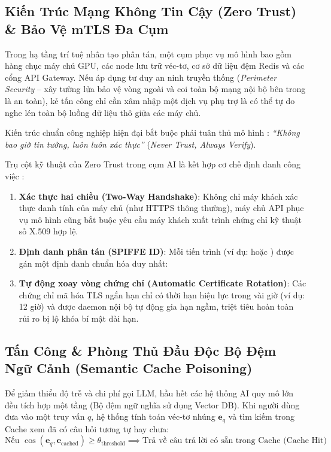 \subsection{Kiến Trúc Mạng Không Tin Cậy (Zero Trust) \& Bảo Vệ mTLS Đa Cụm}
Trong hạ tầng trí tuệ nhân tạo phân tán, một cụm phục vụ mô hình bao gồm hàng chục máy chủ GPU, các node lưu trữ véc-tơ, cơ sở dữ liệu đệm Redis và các cổng API Gateway. Nếu áp dụng tư duy an ninh truyền thống (\textit{Perimeter Security} -- xây tường lửa bảo vệ vòng ngoài và coi toàn bộ mạng nội bộ bên trong là an toàn), kẻ tấn công chỉ cần xâm nhập một dịch vụ phụ trợ là có thể tự do nghe lén toàn bộ luồng dữ liệu thô giữa các máy chủ.

Kiến trúc chuẩn công nghiệp hiện đại bắt buộc phải tuân thủ mô hình : \textit{``Không bao giờ tin tưởng, luôn luôn xác thực''} (\textit{Never Trust, Always Verify}).

Trụ cột kỹ thuật của Zero Trust trong cụm AI là  kết hợp cơ chế định danh công việc :
\begin{enumerate}
  \item \textbf{Xác thực hai chiều (Two-Way Handshake)}: Không chỉ máy khách xác thực danh tính của máy chủ (như HTTPS thông thường), máy chủ API phục vụ mô hình cũng bắt buộc yêu cầu máy khách xuất trình chứng chỉ kỹ thuật số X.509 hợp lệ.
  \item \textbf{Định danh phân tán (SPIFFE ID)}: Mỗi tiến trình (ví dụ:  hoặc ) được gán một định danh chuẩn hóa duy nhất:
  \begin{center}
  \end{center}
  \item \textbf{Tự động xoay vòng chứng chỉ (Automatic Certificate Rotation)}: Các chứng chỉ mã hóa TLS ngắn hạn chỉ có thời hạn hiệu lực trong vài giờ (ví dụ: 12 giờ) và được daemon nội bộ tự động gia hạn ngầm, triệt tiêu hoàn toàn rủi ro bị lộ khóa bí mật dài hạn.
\end{enumerate}

\subsection{Tấn Công \& Phòng Thủ Đầu Độc Bộ Đệm Ngữ Cảnh (Semantic Cache Poisoning)}
Để giảm thiểu độ trễ và chi phí gọi LLM, hầu hết các hệ thống AI quy mô lớn đều tích hợp một tầng  (Bộ đệm ngữ nghĩa sử dụng Vector DB). Khi người dùng đưa vào một truy vấn $q$, hệ thống tính toán véc-tơ nhúng $\mathbf{e}_q$ và tìm kiếm trong Cache xem đã có câu hỏi tương tự hay chưa:
\begin{equation}
\text{Nếu } \cos(\mathbf{e}_q, \mathbf{e}_{\text{cached}}) \ge \theta_{\text{threshold}} \implies \text{Trả về câu trả lời có sẵn trong Cache (Cache Hit)}
\end{equation}

